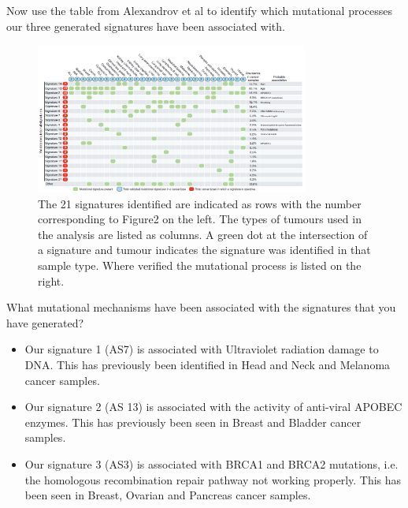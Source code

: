 Now use the table from Alexandrov et al to identify which mutational
processes our three generated signatures have been associated with.

\begin{figure}[H]
\centering
\includegraphics[width=0.8\textwidth]{handout/mutational_processes.png}
\caption{The 21 signatures identified are indicated as rows with the number corresponding to Figure2 on the left. The types of tumours used in the analysis are listed as columns. A green dot at the intersection of a signature and tumour indicates the signature was identified in that sample type. Where verified the mutational process is listed on the right.}
\label{Figure 3 Table indicating the probable association of the identified signatures with mutational processes and the origin site of the cancer samples from Alexandrov et al. Nature 2013.}
\end{figure}

\begin{questions}
What mutational mechanisms have been associated with the signatures that you have generated?
\end{questions}

\begin{answer}
\begin{itemize}
\item Our signature 1 (AS7) is associated with Ultraviolet radiation damage to DNA. This has previously been identified in Head and Neck and Melanoma cancer samples.
\item Our signature 2 (AS 13) is associated with the activity of anti-viral APOBEC enzymes. This has previously been seen in Breast and Bladder cancer samples.
\item Our signature 3 (AS3) is associated with BRCA1 and BRCA2 mutations, i.e. the homologous recombination repair pathway not working properly. This has been seen in Breast, Ovarian and Pancreas cancer samples.
\end{itemize}
\end{answer}

